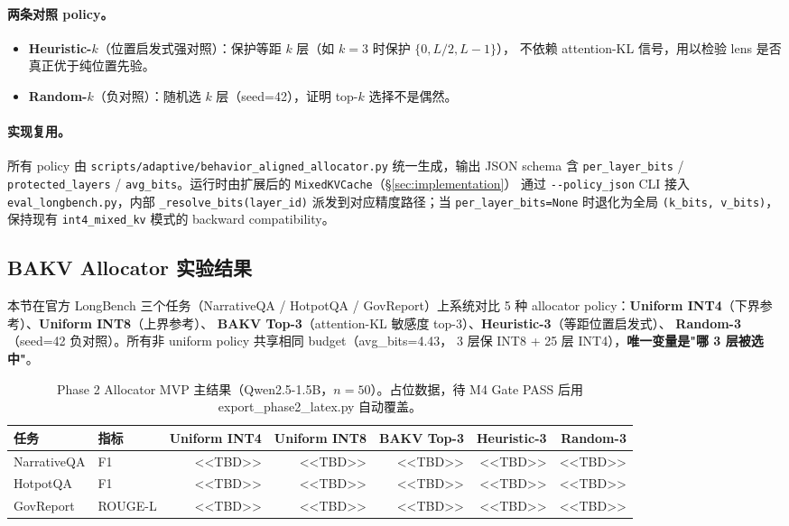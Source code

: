\paragraph{两条对照 policy。}
\begin{itemize}
    \item \textbf{Heuristic-$k$}（位置启发式强对照）：保护等距 $k$ 层（如 $k=3$ 时保护 $\{0, L/2, L-1\}$），
    不依赖 attention-KL 信号，用以检验 lens 是否真正优于纯位置先验。
    \item \textbf{Random-$k$}（负对照）：随机选 $k$ 层（seed=42），证明 top-$k$ 选择不是偶然。
\end{itemize}

\paragraph{实现复用。}
所有 policy 由 \texttt{scripts/adaptive/behavior\_aligned\_allocator.py}
统一生成，输出 JSON schema 含 \texttt{per\_layer\_bits} / \texttt{protected\_layers} /
\texttt{avg\_bits}。运行时由扩展后的 \texttt{MixedKVCache}（§\ref{sec:implementation}）
通过 \texttt{\--\--policy\_json} CLI 接入 \texttt{eval\_longbench.py}，内部
\texttt{\_resolve\_bits(layer\_id)} 派发到对应精度路径；当 \texttt{per\_layer\_bits=None}
时退化为全局 \texttt{(k\_bits, v\_bits)}，保持现有 \texttt{int4\_mixed\_kv}
模式的 backward compatibility。


\subsection{BAKV Allocator 实验结果}
\label{subsec:exp-allocator-mvp}

本节在官方 LongBench 三个任务（NarrativeQA / HotpotQA / GovReport）上系统对比
5 种 allocator policy：\textbf{Uniform INT4}（下界参考）、\textbf{Uniform INT8}（上界参考）、
\textbf{BAKV Top-3}（attention-KL 敏感度 top-3）、\textbf{Heuristic-3}（等距位置启发式）、
\textbf{Random-3}（seed=42 负对照）。所有非 uniform policy 共享相同 budget（avg\_bits=4.43，
3 层保 INT8 + 25 层 INT4），\textbf{唯一变量是"哪 3 层被选中"}。

% 
\begin{table}[!htbp]
\centering
\caption{Phase 2 Allocator MVP 主结果（Qwen2.5-1.5B，$n=50$）。占位数据，待 M4 Gate PASS 后用 export\_phase2\_latex.py 自动覆盖。}
\label{tab:phase2-allocator-mvp-1p5b}
\begin{tabular}{llrrrrr}
\toprule
任务 & 指标 & Uniform INT4 & Uniform INT8 & BAKV Top-3 & Heuristic-3 & Random-3 \\
\midrule
NarrativeQA & F1       & <<TBD>> & <<TBD>> & <<TBD>> & <<TBD>> & <<TBD>> \\
HotpotQA    & F1       & <<TBD>> & <<TBD>> & <<TBD>> & <<TBD>> & <<TBD>> \\
GovReport   & ROUGE-L  & <<TBD>> & <<TBD>> & <<TBD>> & <<TBD>> & <<TBD>> \\
\bottomrule
\end{tabular}
\end{table}

